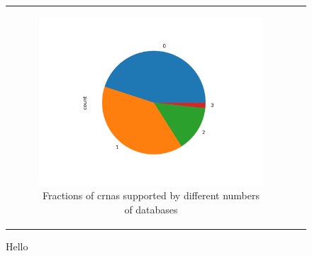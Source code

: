 \begin{figure}[ht]
\begin{tabular}{cc}
\begin{subfigure}{0.5\textwidth}
                       \includegraphics[width=\linewidth]{chapters/4_results_and_discussion/figures/detection/database_count.png}
                       \caption{Fractions of \glspl{crna} supported by different numbers of databases}
                       \label{fig:db_pie}
                   \end{subfigure}
    \end{tabular}
    \caption{Hello
    }
    \label{fig:db_agreement}
\end{figure}
